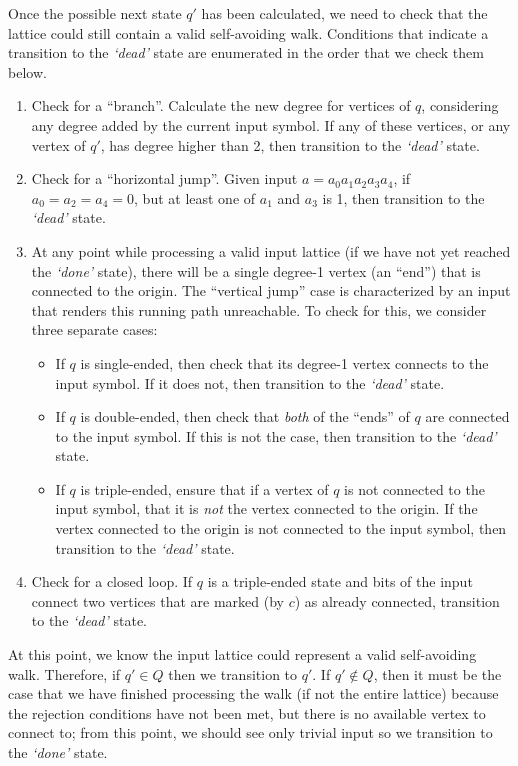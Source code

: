 Once the possible next state $q'$ has been calculated, we need to check that the lattice could still contain a valid self-avoiding walk. Conditions that indicate a transition to the \emph{`dead'} state are enumerated in the order that we check them below.
\begin{enumerate}
\item Check for a ``branch''. Calculate the new degree for vertices of $q$, considering any degree added by the current input symbol. If any of these vertices, or any vertex of $q'$, has degree higher than 2, then transition to the \emph{`dead'} state.
\item Check for a ``horizontal jump''. Given input $a=a_0a_1a_2a_3a_4$, if $a_0 = a_2 = a_4 = 0$, but at least one of $a_1$ and $a_3$ is 1, then transition to the \emph{`dead'} state.
\item At any point while processing a valid input lattice (if we have not yet reached the \emph{`done'} state), there will be a single degree-1 vertex (an ``end'') that is connected to the origin. The ``vertical jump'' case is characterized by an input that renders this running path unreachable. To check for this, we consider three separate cases:
\begin{itemize}
\item If $q$ is single-ended, then check that its degree-1 vertex connects to the input symbol. If it does not, then transition to the \emph{`dead'} state. 
\item If $q$ is double-ended, then check that \emph{both} of the ``ends'' of $q$ are connected to the input symbol. If this is not the case, then transition to the \emph{`dead'} state.
\item If $q$ is triple-ended, ensure that if a vertex of $q$ is not connected to the input symbol, that it is \emph{not} the vertex connected to the origin. If the vertex connected to the origin is not connected to the input symbol, then transition to the \emph{`dead'} state.
\end{itemize}
\item Check for a closed loop. If $q$ is a triple-ended state and bits of the input connect two vertices that are marked (by $c$) as already connected, transition to the \emph{`dead'} state.
\end{enumerate}

At this point, we know the input lattice could represent a valid self-avoiding walk. Therefore, if $q'\in Q$ then we transition to $q'$. If $q'\notin Q$, then it must be the case that we have finished processing the walk (if not the entire lattice) because the rejection conditions have not been met, but there is no available vertex to connect to; from this point, we should see only trivial input so we transition to the \emph{`done'} state.
